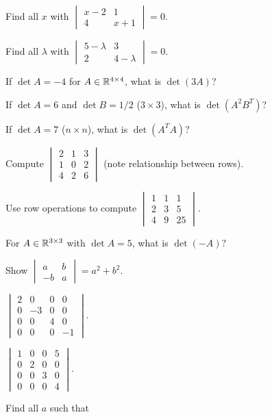 \begin{problems}
  \item Find all $x$ with $\begin{vmatrix} x - 2 & 1 \\ 4 & x + 1 \end{vmatrix} = 0$.
  \item Find all $\lambda$ with $\begin{vmatrix} 5 - \lambda & 3 \\ 2 & 4 - \lambda \end{vmatrix} = 0$.
  \item If $\det A = -4$ for $A \in \mathbb{R}^{4 \times 4}$, what is $\det(3 A)$?
  \item If $\det A = 6$ and $\det B = 1/2$ ($3 \times 3$), what is
        $\det(A^{2} B^{T})$?
  \item If $\det A = 7$ ($n \times n$), what is $\det(A^{T} A)$?
  \item Compute $\begin{vmatrix} 2 & 1 & 3 \\ 1 & 0 & 2 \\ 4 & 2 & 6 \end{vmatrix}$
        (note relationship between rows).
  \item Use row operations to compute
        $\begin{vmatrix} 1 & 1 & 1 \\ 2 & 3 & 5 \\ 4 & 9 & 25 \end{vmatrix}$.
  \item For $A \in \mathbb{R}^{3 \times 3}$ with $\det A = 5$, what is $\det(-A)$?
  \item Show $\begin{vmatrix} a & b \\ -b & a \end{vmatrix} = a^{2} + b^{2}$.
  \item $\begin{vmatrix} 2 & 0 & 0 & 0 \\ 0 & -3 & 0 & 0 \\ 0 & 0 & 4 & 0 \\ 0 & 0 & 0 & -1 \end{vmatrix}$.
  \item $\begin{vmatrix} 1 & 0 & 0 & 5 \\ 0 & 2 & 0 & 0 \\ 0 & 0 & 3 & 0 \\ 0 & 0 & 0 & 4 \end{vmatrix}$.
  \item Find all $a$ such that

\end{problems}
